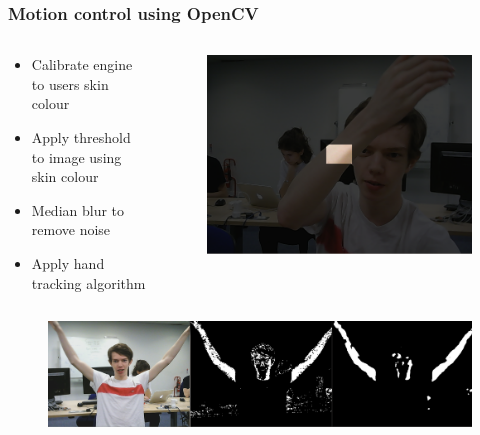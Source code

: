 \documentclass{beamer}
\begin{document}
\begin{frame}
\frametitle{Motion control using OpenCV}
\begin{columns}
	\begin{column}{0.65\textwidth}
		\begin{itemize}
			\item Calibrate engine to users skin colour
			\item Apply threshold to image using skin colour
			\item Median blur to remove noise
			\item Apply hand tracking algorithm
		\end{itemize}
	\end{column}
	\begin{column}{0.35\textwidth}
		\begin{figure}
			\includegraphics[width=\textwidth]{Presentation/calibration.png}
		\end{figure}
	\end{column}
\end{columns}
\begin{figure}
	\includegraphics[width=\textwidth]{Presentation/opencv.png}
\end{figure}
\end{frame}
\end{document}
